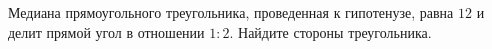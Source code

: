 \begin{ex}
	\begin{condition}
		Медиана прямоугольного треугольника, проведенная к гипотенузе, равна \( 12  \) и делит прямой угол в отношении \( 1 : 2 \).	Найдите стороны треугольника.
	\end{condition}
\end{ex}